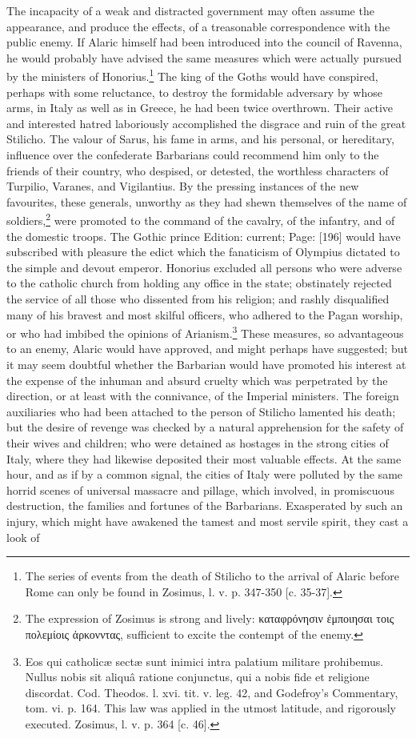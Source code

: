 The incapacity of a weak and distracted government may often assume the appearance, and produce the effects, of a treasonable correspondence with the public enemy. If Alaric himself had been introduced into the council of Ravenna, he would probably have advised the same measures which were actually pursued by the ministers of Honorius.\footnote{The series of events from the death of Stilicho to the arrival of Alaric before Rome can only be found in Zosimus, l. v. p. 347-350 [c. 35-37].} The king of the Goths would have conspired, perhaps with some reluctance, to destroy the formidable adversary by whose arms, in Italy as well as in Greece, he had been twice overthrown. Their active and interested hatred laboriously accomplished the disgrace and ruin of the great Stilicho. The valour of Sarus, his fame in arms, and his personal, or hereditary, influence over the confederate Barbarians could recommend him only to the friends of their country, who despised, or detested, the worthless characters of Turpilio, Varanes, and Vigilantius. By the pressing instances of the new favourites, these generals, unworthy as they had shewn themselves of the name of soldiers,\footnote{The expression of Zosimus is strong and lively: \textgreek{καταφρόνησιν \texthebrew{ἐ}μποιησαι τοις πολεμίοις \texthebrew{ἀ}ρκονντας}, sufficient to excite the contempt of the enemy.} were promoted to the command of the cavalry, of the infantry, and of the domestic troops. The Gothic prince Edition: current; Page: [196] would have subscribed with pleasure the edict which the fanaticism of Olympius dictated to the simple and devout emperor. Honorius excluded all persons who were adverse to the catholic church from holding any office in the state; obstinately rejected the service of all those who dissented from his religion; and rashly disqualified many of his bravest and most skilful officers, who adhered to the Pagan worship, or who had imbibed the opinions of Arianism.\footnote{Eos qui catholicæ sectæ sunt inimici intra palatium militare prohibemus. Nullus nobis sit aliquâ ratione conjunctus, qui a nobis fide et religione discordat. Cod. Theodos. l. xvi. tit. v. leg. 42, and Godefroy\texthebrew{}’s Commentary, tom. vi. p. 164. This law was applied in the utmost latitude, and rigorously executed. Zosimus, l. v. p. 364 [c. 46].} These measures, so advantageous to an enemy, Alaric would have approved, and might perhaps have suggested; but it may seem doubtful whether the Barbarian would have promoted his interest at the expense of the inhuman and absurd cruelty which was perpetrated by the direction, or at least with the connivance, of the Imperial ministers. The foreign auxiliaries who had been attached to the person of Stilicho lamented his death; but the desire of revenge was checked by a natural apprehension for the safety of their wives and children; who were detained as hostages in the strong cities of Italy, where they had likewise deposited their most valuable effects. At the same hour, and as if by a common signal, the cities of Italy were polluted by the same horrid scenes of universal massacre and pillage, which involved, in promiscuous destruction, the families and fortunes of the Barbarians. Exasperated by such an injury, which might have awakened the tamest and most servile spirit, they cast a look of 
